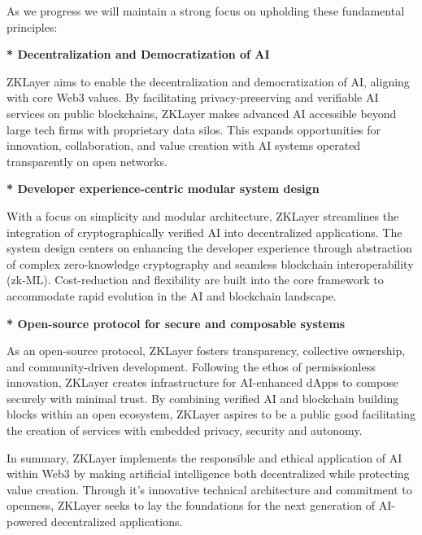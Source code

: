 \documentclass[conference]{IEEEtran}
\begin{document}
As we progress we will maintain a strong focus on upholding these fundamental principles:

\textbf{* Decentralization and Democratization of AI}

ZKLayer aims to enable the decentralization and democratization of AI, aligning with core Web3 values. By facilitating privacy-preserving and veriﬁable AI services on public blockchains, ZKLayer makes advanced AI accessible beyond large tech ﬁrms with proprietary data silos. This expands opportunities for innovation, collaboration, and value creation with AI systems operated transparently on open networks.

\textbf{* Developer experience-centric modular system design}

With a focus on simplicity and modular architecture, ZKLayer streamlines the integration of cryptographically veriﬁed AI into decentralized applications. The system design centers on enhancing the developer experience through abstraction of complex zero-knowledge cryptography and seamless blockchain interoperability (zk-ML). Cost-reduction and ﬂexibility are built into the core framework to accommodate rapid evolution in the AI and blockchain landscape.

\textbf{* Open-source protocol for secure and composable systems}

As an open-source protocol, ZKLayer fosters transparency, collective ownership, and community-driven development. Following the ethos of permissionless innovation, ZKLayer creates infrastructure for AI-enhanced dApps to compose securely with minimal trust. By combining veriﬁed AI and blockchain building blocks within an open ecosystem, ZKLayer aspires to be a public good facilitating the creation of services with embedded privacy, security and autonomy.

In summary, ZKLayer implements the responsible and ethical application of AI within Web3 by making artiﬁcial intelligence both decentralized while protecting value creation. Through it’s innovative technical architecture and commitment to openness, ZKLayer seeks to lay the foundations for the next generation of AI-powered decentralized applications.



\clearpage







\end{document}
